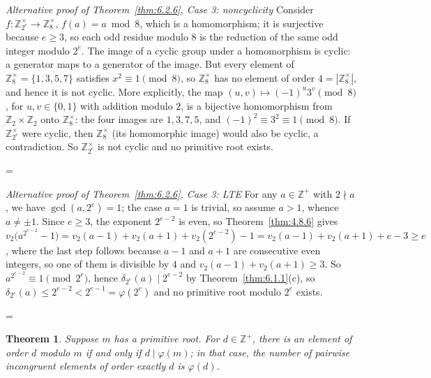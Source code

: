 \documentclass[11pt]{article}
\makeatletter
\theoremstyle{ntstyle}
\newtheorem{theorem}{Theorem}[subsection]
\let\nt@closedisplay\]
\def\nt@guardedclose{\@ifnextchar\par{\nt@closeafterpar}{\@ifnextchar\end{\postdisplaypenalty\@M\nt@closedisplay}{\nt@closedisplay}}}
\def\nt@closeafterpar\par{\@ifnextchar\par{\nt@closeafterpar}{\@ifnextchar\end{\postdisplaypenalty\@M\nt@closedisplay\par}{\nt@closedisplay\par}}}
\renewenvironment{proof}[1][\proofname]{\par
  \pushQED{\qed}\normalfont\topsep\medskipamount\edef\nt@afterproof{\@endparpenalty=\the\@endparpenalty\relax}\@beginparpenalty\@M\@endparpenalty\@M\let\]\nt@guardedclose\trivlist\item[]\textit{#1\@addpunct{.}} \ignorespaces}{\ifvmode\addpenalty\@M\fi\popQED\nt@afterproof\endtrivlist\@endpefalse}
\newenvironment{altproof}[1][\proofname]{\begin{proof}[#1]\renewcommand{\qedsymbol}{}}{\end{proof}}
\newcommand{\ZmodUnits}[1]{\mathbb{Z}_{#1}^{\times}}
\makeatother
\begin{document}
\begin{altproof}[Alternative proof of Theorem~\ref{thm:6.2.6}, Case 3: noncyclicity] Consider $f : \ZmodUnits{2^e} \to
		\ZmodUnits{8}$, $f(a) = a \bmod 8$, which is a
	homomorphism; it is surjective because $e\ge3$, so each odd residue
	modulo $8$ is the reduction of the same odd integer modulo $2^e$. The image of a cyclic group under a homomorphism is
	cyclic: a generator maps to a generator of the image. But every element of $\ZmodUnits{8} = \{1, 3, 5, 7\}$
	satisfies $x^{2} \equiv 1 \pmod{8}$, so $\ZmodUnits{8}$ has no
	element of order $4=|\ZmodUnits{8}|$, and hence it is not cyclic.
	More explicitly, the map $(u,v)\mapsto(-1)^u3^v\pmod8$, for
	$u,v\in\{0,1\}$ with addition modulo $2$, is a bijective homomorphism
	from $\mathbb{Z}_2\times\mathbb{Z}_2$ onto $\ZmodUnits{8}$:
	the four images are $1,3,7,5$, and $(-1)^2\equiv3^2\equiv1\pmod8$.
	If $\ZmodUnits{2^e}$ were cyclic, then
	$\ZmodUnits{8}$ (its homomorphic image) would also be cyclic,
	a contradiction. So $\ZmodUnits{2^e}$ is not cyclic and no
	primitive root exists.

\end{altproof}
\begin{altproof}[Alternative proof of Theorem~\ref{thm:6.2.6}, Case 3: LTE] For any $a \in \mathbb{Z}^+$ with
	$2 \nmid a$, we have $\gcd(a, 2^e) = 1$; the case $a = 1$ is trivial, so assume $a > 1$, whence $a \neq \pm 1$. Since $e \ge 3$, the exponent $2^{e-2}$ is even, so Theorem~\ref{thm:4.8.6} gives $v_2\big(a^{2^{e-2}} -
		1\big) = v_2(a-1) + v_2(a+1) + v_2(2^{e-2}) - 1 = v_2(a-1) + v_2(a+1)
		+ e - 3 \ge e$, where the last step follows because $a-1$ and $a+1$ are consecutive
	even integers, so one of them is divisible by $4$ and $v_2(a-1) +
		v_2(a+1) \ge 3$. So
	$a^{2^{e-2}} \equiv 1 \pmod{2^e}$, hence $\delta_{2^e}(a) \mid
		2^{e-2}$ by Theorem~\ref{thm:6.1.1}(c), so $\delta_{2^e}(a) \le 2^{e-2} < 2^{e-1} = \varphi(2^e)$ and no primitive root modulo $2^{e}$ exists.

\end{altproof}
\begin{theorem}\label{thm:6.2.7}
	Suppose $m$ has a primitive root. For $d \in \mathbb{Z}^+$, there
	is an element of order $d$ modulo $m$ if and only if $d \mid
		\varphi(m)$; in that case, the number of pairwise incongruent elements
	of order exactly $d$ is $\varphi(d)$.

\end{theorem}
\end{document}
